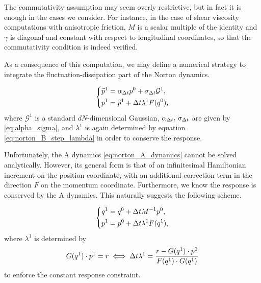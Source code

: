 \begin{remark}
    The commutativity assumption may seem overly restrictive, but in fact it is enough in the cases we consider. 
    For instance, in the case of shear viscosity computations with anisotropic friction, $M$ is a scalar multiple of the identity and $\gamma$ is diagonal and constant with respect to longitudinal coordinates, so that the commutativity condition is indeed verified.
\end{remark}

As a consequence of this computation, we may define a numerical strategy to integrate the fluctuation-dissipation part of the Norton dynamics.

\begin{algorithm}
    \begin{equation}
        \label{eq:norton_O_step}
        \left\{
            \begin{aligned}
                \widetilde{p}^{1} &= \alpha_{{\Delta t}}p^0 +\sigma_{{\Delta t}}\mathcal G^1,\\
                p^{1} &= \widetilde{p}^{1} + {\Delta t}\lambda^{1} F(q^{0}),
            \end{aligned}
        \right.
    \end{equation}
    where $\mathcal G^1$ is a standard $dN$-dimensional Gaussian, $\alpha_{\Delta t},\,\sigma_{\Delta t} $ are given by \eqref{eq:alpha_sigma}, and $\lambda^{1}$ is again determined by equation \eqref{eq:norton_B_step_lambda} in order to conserve the response.
\end{algorithm}

Unfortunately, the A dynamics \eqref{eq:norton_A_dynamics} cannot be solved analytically. 
However, its general form is that of an infinitesimal Hamiltonian increment on the position coordinate, with an additional correction term in the direction $F$ on the momentum coordinate. 
Furthermore, we know the response is conserved by the A dynamics. This naturally suggests the following scheme.

\begin{algorithm}
    \begin{equation}
        \label{eq:norton_A_step}
        \left\{\begin{aligned}
            q^1 &= q^0 + {\Delta t} M^{-1}p^0, \\
            p^1 &= p^0 +{\Delta t}\lambda^{1} F(q^1),
        \end{aligned}\right.
    \end{equation}
where $\lambda^{1}$ is determined by 
\begin{equation}
    \label{eq:norton_A_step_lambda}
    G(q^1)\cdot p^{1} = r \iff {\Delta t}\lambda^{1} = \frac{r-G(q^1)\cdot p^0}{F(q^1)\cdot G(q^1)}
\end{equation}
to enforce the constant response constraint.
\end{algorithm}

